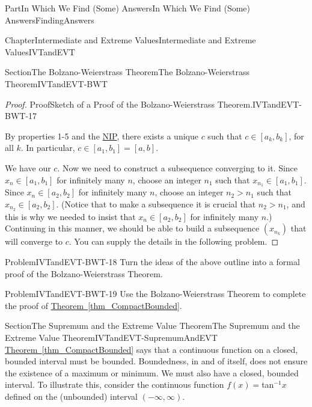 \documentclass[oneside,10pt,]{book}
\newcommand{\xreffont}{\relax}
\numberwithin{equation}{part}
\begin{document}
\begin{partptx}{Part}{In Which We Find (Some) Answers}{}{In Which We Find (Some) Answers}{}{}{FindingAnswers}
\begin{chapterptx}{Chapter}{Intermediate and Extreme Values}{}{Intermediate and Extreme Values}{}{}{IVTandEVT}
\begin{sectionptx}{Section}{The Bolzano-Weierstrass Theorem}{}{The Bolzano-Weierstrass Theorem}{}{}{IVTandEVT-BWT}
\begin{proof}{Proof}{Sketch of a Proof of the Bolzano-Weierstrass Theorem.}{IVTandEVT-BWT-17}
%
\par
By properties 1-5 and the \hyperref[NIP]{NIP}, there exists a unique \(c\) such that \(c\in[a_k,b_k]\), for all \(k\). In particular, \(c\in[a_1,b_1]=[a,b]\).%
\par
We have our \(c\). Now we need to construct a subsequence converging to it. Since \(x_n\in[a_1,b_1]\) for infinitely many \(n\), choose an integer \(n_1\) such that \(x_{n_1}\in[a_1,b_1]\). Since \(x_n\in[a_2,b_2]\) for infinitely many \(n\), choose an integer \(n_2>n_1\) such that \(x_{n_2}\in[a_2,b_2]\). (Notice that to make a subsequence it is crucial that \(n_2>n_1\), and this is why we needed to insist that \(x_n\in[a_2,b_2]\) for infinitely many \(n\).) Continuing in this manner, we should be able to build a subsequence \(\left(x_{n_k}\right)\) that will converge to \(c\). You can supply the details in the following problem.%
\end{proof}
\begin{problem}{Problem}{}{IVTandEVT-BWT-18}%
 Turn the ideas of the above outline into a formal proof of the Bolzano-Weierstrass Theorem.%
\end{problem}
\begin{problem}{Problem}{}{IVTandEVT-BWT-19}%
 Use the Bolzano-Weierstrass Theorem to complete the proof of \hyperref[thm_CompactBounded]{Theorem~{\xreffont\ref{thm_CompactBounded}}}.%
\end{problem}
\end{sectionptx}
%
%
\typeout{************************************************}
\typeout{************************************************}
%
\begin{sectionptx}{Section}{The Supremum and the Extreme Value Theorem}{}{The Supremum and the Extreme Value Theorem}{}{}{IVTandEVT-SupremumAndEVT}
\hyperref[thm_CompactBounded]{Theorem~{\xreffont\ref{thm_CompactBounded}}} says that a continuous function on a closed, bounded interval must be bounded. Boundedness, in and of itself, does not ensure the existence of a maximum or minimum. We must also have a closed, bounded interval. To illustrate this, consider the continuous function \(f(x)=\)tan\(^{-1}x\) defined on the (unbounded) interval \(\left(-\infty,\infty\right)\).%

\end{sectionptx}
\end{chapterptx}
\end{partptx}
\end{document}
